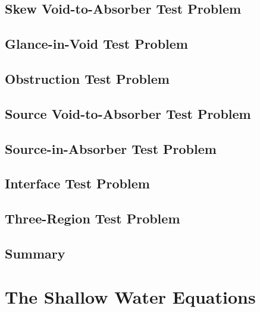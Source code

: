 \subsection{Skew Void-to-Absorber Test Problem\label{sec:skew_void_to_absorber}}
  
\subsection{Glance-in-Void Test Problem\label{sec:glance_in_void}}
  
\subsection{Obstruction Test Problem\label{sec:obstruction}}
  
\subsection{Source Void-to-Absorber Test Problem\label{sec:source_void_to_absorber}}
  
\subsection{Source-in-Absorber Test Problem\label{sec:source_in_absorber}}
  
\subsection{Interface Test Problem\label{sec:interface}}
  
\subsection{Three-Region Test Problem\label{sec:three_region}}
  
\subsection{Summary\label{sec:scalar_summary}}
  
\section{The Shallow Water Equations\label{sec:shallow_water_results}}
